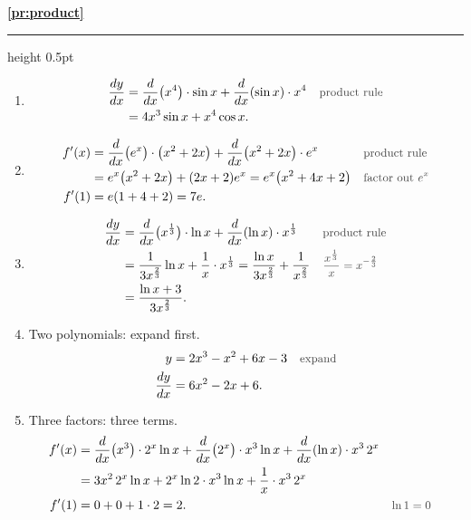 \documentclass[11pt,a4paper]{article}
\newcommand{\solitem}[2]{%
 \par\addvspace{16pt}\Needspace{10\baselineskip}%
 {\large\bfseries \ref{#1}}\par\nobreak\vspace{2pt}%
 {\color{rulegray}\hrule height 0.5pt}\nobreak\vspace{7pt}%
 #2\par}
\newcommand{\why}[1]{\text{\small\color{darkgray}#1}}
\begin{document}
\solitem{pr:product}{%
\begin{enumerate}[label=(\alph*)]
 \item
 \begin{align*}
 \frac{dy}{dx}&=\frac{d}{dx}\bigl(x^4\bigr)\cdot\sin x+\frac{d}{dx}(\sin x)\cdot x^4 &&\why{product rule}\\
 &=4x^3\sin x+x^4\cos x.
 \end{align*}
 \item
 \begin{align*}
 f'(x)&=\frac{d}{dx}\bigl(e^x\bigr)\cdot\bigl(x^2+2x\bigr)+\frac{d}{dx}\bigl(x^2+2x\bigr)\cdot e^x &&\why{product rule}\\
 &=e^x\bigl(x^2+2x\bigr)+(2x+2)e^x=e^x\bigl(x^2+4x+2\bigr) &&\why{factor out $e^x$}\\
 f'(1)&=e(1+4+2)=7e.
 \end{align*}
 \item
 \begin{align*}
 \frac{dy}{dx}&=\frac{d}{dx}\bigl(x^{\frac13}\bigr)\cdot\ln x+\frac{d}{dx}(\ln x)\cdot x^{\frac13} &&\why{product rule}\\
 &=\frac{1}{3x^{\frac23}}\ln x+\frac1x\cdot x^{\frac13}=\frac{\ln x}{3x^{\frac23}}+\frac{1}{x^{\frac23}} &&\why{$\dfrac{x^{\frac13}}{x}=x^{-\frac23}$}\\
 &=\frac{\ln x+3}{3x^{\frac23}}.
 \end{align*}
 \item Two polynomials: expand first.
 \begin{align*}
 y&=2x^3-x^2+6x-3 &&\why{expand}\\
 \frac{dy}{dx}&=6x^2-2x+6.
 \end{align*}
 \item Three factors: three terms.
 \begin{align*}
 f'(x)&=\frac{d}{dx}\bigl(x^3\bigr)\cdot2^x\ln x+\frac{d}{dx}\bigl(2^x\bigr)\cdot x^3\ln x+\frac{d}{dx}(\ln x)\cdot x^3\,2^x\\
 &=3x^2\,2^x\ln x+2^x\ln2\cdot x^3\ln x+\frac1x\cdot x^3\,2^x\\
 f'(1)&=0+0+1\cdot2=2. &&\why{$\ln1=0$}
 \end{align*}
\end{enumerate}
}
\end{document}
